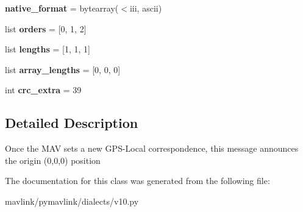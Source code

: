 \begin{DoxyCompactItemize}
{\bfseries native\+\_\+format} = bytearray(\textquotesingle{}$<$iii\textquotesingle{}, \textquotesingle{}ascii\textquotesingle{})
\item 
\mbox{\label{classpymavlink_1_1dialects_1_1v10_1_1MAVLink__gps__global__origin__message_ab361eaa3334aa514376b5f8df847dd95}} 
list {\bfseries orders} = \mbox{[}0, 1, 2\mbox{]}
\item 
\mbox{\label{classpymavlink_1_1dialects_1_1v10_1_1MAVLink__gps__global__origin__message_aa79a42ccd19f39f625675f845e074dfe}} 
list {\bfseries lengths} = \mbox{[}1, 1, 1\mbox{]}
\item 
\mbox{\label{classpymavlink_1_1dialects_1_1v10_1_1MAVLink__gps__global__origin__message_a102931a7c2a7391b2b2bf88fd643df7e}} 
list {\bfseries array\+\_\+lengths} = \mbox{[}0, 0, 0\mbox{]}
\item 
\mbox{\label{classpymavlink_1_1dialects_1_1v10_1_1MAVLink__gps__global__origin__message_a8021515f817ecfb174cc033af5f02c04}} 
int {\bfseries crc\+\_\+extra} = 39
\end{DoxyCompactItemize}


\subsection{Detailed Description}
\begin{DoxyVerb}Once the MAV sets a new GPS-Local correspondence, this message
announces the origin (0,0,0) position
\end{DoxyVerb}
 

The documentation for this class was generated from the following file\+:\begin{DoxyCompactItemize}
\item 
mavlink/pymavlink/dialects/v10.\+py\end{DoxyCompactItemize}
